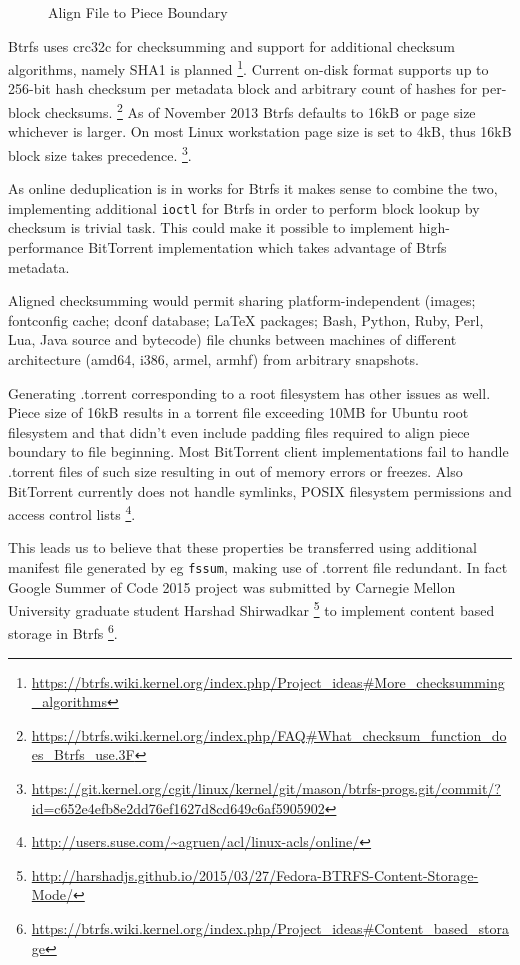 \documentclass[a4paper,11pt]{kth-mag}
\begin{document}
\begin{figure}[!htb]
\centering
\scalebox{0.35}{}
\caption{Align File to Piece Boundary}
\label{fig:torrent-multifile-aligned}
\end{figure}


Btrfs uses crc32c for checksumming and support for additional
checksum algorithms, namely SHA1 is planned
\footnote{\url{https://btrfs.wiki.kernel.org/index.php/Project_ideas\#More_checksumming_algorithms}}.
Current on-disk format supports up to 256-bit hash checksum per
metadata block and arbitrary count of hashes for per-block checksums.
\footnote{\url{https://btrfs.wiki.kernel.org/index.php/FAQ\#What_checksum_function_does_Btrfs_use.3F}}
As of November 2013 Btrfs defaults to 16kB or page size
whichever is larger.
On most Linux workstation page size is set to 4kB, thus 16kB block
size takes precedence.
\footnote{\url{https://git.kernel.org/cgit/linux/kernel/git/mason/btrfs-progs.git/commit/?id=c652e4efb8e2dd76ef1627d8cd649c6af5905902}}.

As online deduplication is in works for Btrfs it makes sense to
combine the two, implementing additional \texttt{ioctl} for Btrfs in
order to perform block lookup by checksum is trivial task.
This could make it possible to implement high-performance
BitTorrent implementation which takes advantage of Btrfs metadata.

Aligned checksumming would permit sharing platform-independent
(images; fontconfig cache; dconf database; LaTeX packages;
Bash, Python, Ruby, Perl, Lua, Java source and bytecode)
file chunks between machines of different architecture (amd64, i386, armel, armhf)
from arbitrary snapshots.

Generating .torrent corresponding to a root filesystem
has other issues as well.
Piece size of 16kB results in a torrent file
exceeding 10MB for Ubuntu root filesystem and that didn't even
include padding files required to align piece boundary to file beginning.
Most BitTorrent client implementations fail to handle .torrent
files of such size resulting in out of memory errors or freezes.
Also BitTorrent currently does not handle symlinks,
POSIX filesystem permissions and access control lists
\footnote{\url{http://users.suse.com/~agruen/acl/linux-acls/online/}}.

This leads us to believe that these properties be transferred
using additional manifest file generated by eg \texttt{fssum},
making use of .torrent file redundant.
In fact Google Summer of Code 2015 project was submitted by
Carnegie Mellon University graduate student Harshad Shirwadkar
\footnote{\url{http://harshadjs.github.io/2015/03/27/Fedora-BTRFS-Content-Storage-Mode/}}
to implement content based storage in Btrfs
\footnote{\url{https://btrfs.wiki.kernel.org/index.php/Project_ideas\#Content_based_storage}}.
\end{document}
